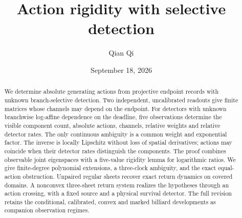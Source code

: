 
\usepackage{array}
\raggedbottom
{}
\title[Action rigidity with selective detection]{Action rigidity with selective detection}
\author{Qian Qi}
\date{September 18, 2026}

\begin{abstract}
We determine absolute generating actions from projective endpoint records
with unknown branch-selective detection. Two independent, uncalibrated
readouts give finite matrices whose channels may depend on the endpoint.
For detectors with unknown branchwise log-affine dependence on the
deadline, five observations determine the visible component count,
absolute actions, channels, relative weights and relative detector rates.
The only continuous ambiguity is a common weight and exponential factor.
The inverse is locally Lipschitz without loss of spatial derivatives;
actions may coincide when their detector rates distinguish the components.
The proof combines observable joint eigenspaces with a five-value rigidity
lemma for logarithmic ratios. We give finite-degree polynomial extensions,
a three-clock ambiguity, and the exact equal-action obstruction.
Unpaired regular sheets recover exact return dynamics on covered domains.
A nonconvex three-sheet return system realizes the hypotheses through an
action crossing, with a fixed source and a physical survival detector.
The full revision retains the conditional, calibrated, convex and marked
billiard developments as companion observation regimes.
\end{abstract}
\maketitle
\setcounter{tocdepth}{1}
\tableofcontents
